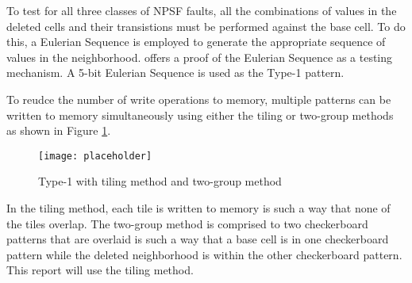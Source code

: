 To test for all three classes of NPSF faults, all the combinations of values in the deleted cells and their transistions must be performed against the base cell.  To do this, a Eulerian Sequence is employed to generate the appropriate sequence of values in the neighborhood.  \cite{1675556} offers a proof of the Eulerian Sequence as a testing mechanism.  A 5-bit Eulerian Sequence is used as the Type-1 pattern.

To reudce the number of write operations to memory, multiple patterns can be written to memory simultaneously using either the tiling or two-group methods as shown in Figure \ref{fig:type1methods}.

\begin{figure}[h]
  \centering
  \texttt{[image: placeholder]}
  \caption{Type-1 with tiling method and two-group method}
  \label{fig:type1methods}
\end{figure}

In the tiling method, each tile is written to memory is such a way that none of the tiles overlap.  The two-group method is comprised to two checkerboard patterns that are overlaid is such a way that a base cell is in one checkerboard pattern while the deleted neighborhood is within the other checkerboard pattern.  This report will use the tiling method.
